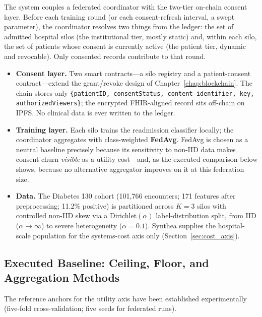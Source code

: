 \documentclass[12pt]{report}
\begin{document}
The system couples a federated coordinator with the two-tier on-chain consent
layer. Before each training round (or each consent-refresh interval, a swept
parameter), the coordinator resolves two things from the ledger: the set of
admitted hospital silos (the institutional tier, mostly static) and, within each
silo, the set of patients whose consent is currently active (the patient tier,
dynamic and revocable). Only consented records contribute to that round.

\begin{itemize}
  \item \textbf{Consent layer.} Two smart contracts---a silo registry and a
        patient-consent contract---extend the grant/revoke design of
        Chapter~\ref{chap:blockchain}. The chain stores only
        \texttt{\{patientID, consentStatus, content-identifier, key,
        authorizedViewers\}}; the encrypted FHIR-aligned record sits off-chain on
        IPFS. No clinical data is ever written to the ledger.
  \item \textbf{Training layer.} Each silo trains the readmission classifier
        locally; the coordinator aggregates with class-weighted \textbf{FedAvg}.
        FedAvg is chosen as a
        neutral baseline precisely because its sensitivity to non-IID data makes
        consent churn \emph{visible} as a utility cost---and, as the executed
        comparison below shows, because no alternative aggregator improves on it
        at this federation size.
  \item \textbf{Data.} The Diabetes 130 cohort (101{,}766 encounters;
        171 features after preprocessing; 11.2\% positive) is
        partitioned across $K{=}3$ silos with controlled non-IID skew via a
        Dirichlet$(\alpha)$ label-distribution split, from IID
        ($\alpha{\to}\infty$) to severe heterogeneity ($\alpha{=}0.1$). Synthea
        supplies the hospital-scale population for the systems-cost axis only
        (Section~\ref{sec:cost_axis}).
\end{itemize}

\subsection{Executed Baseline: Ceiling, Floor, and Aggregation Methods}
\label{sec:executed_baseline}

The reference anchors for the utility axis have been established experimentally
(five-fold cross-validation; five seeds for federated runs).
\end{document}
